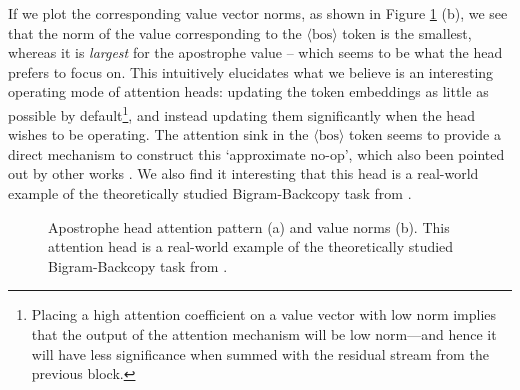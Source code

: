 \documentclass{article} %
\newcommand{\bos}{\ensuremath{\langle\text{bos}\rangle}\xspace}
\begin{document}
If we plot the corresponding value vector norms, as shown in Figure \ref{fig:bos-norm} (b), we see that the norm of the value corresponding to the \bos token is the smallest, whereas it is \emph{largest} for the apostrophe value -- which seems to be what the head prefers to focus on. This intuitively elucidates what we believe is an interesting operating mode of attention heads: updating the token embeddings as little as possible by default\footnote{Placing a high attention coefficient on a value vector with low norm implies that the output of the attention mechanism will be low norm---and hence it will have less significance when summed with the residual stream from the previous block.}, and instead updating them significantly when the head wishes to be operating. The attention sink in the \bos token seems to provide a direct mechanism to construct this `approximate no-op', which also been pointed out by other works \citep{gu2025when}. We also find it interesting that this head is a real-world example of the theoretically studied Bigram-Backcopy task from \citep{guo2024active}. 

\begin{figure}
    \centering
    \qquad
    \caption{Apostrophe head attention pattern (a) and value norms (b). This attention head is a real-world example of the theoretically studied Bigram-Backcopy task from \cite{guo2024active}.}%
    \label{fig:bos-norm}%
    \vspace{-10pt}
\end{figure}
\end{document}
